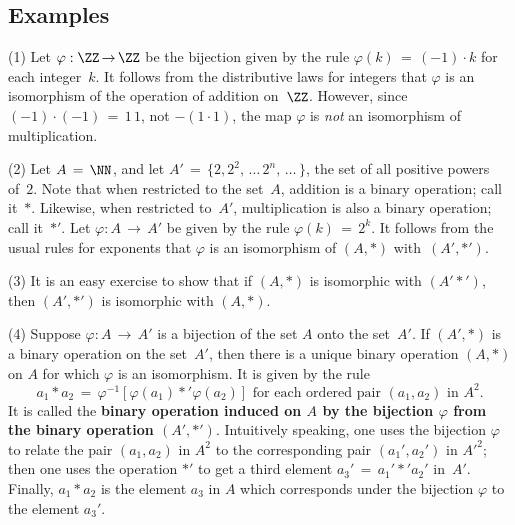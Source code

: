 {\VV

            \subsection{\small{\bf Examples}}
            \label{ExampA60.80}

\V

        (1) Let ${\varphi}:{\ZZ} \,{\rightarrow}\, {\ZZ}$ be the bijection given by the rule ${\varphi}(k) \,=\, (-1){\cdot}k$ for each integer~$k$.
    It follows from the distributive laws for integers that ${\varphi}$ is an isomorphism of the operation of addition on~${\ZZ}$.
    However, since $(-1){\cdot}(-1) \,=\, 1\,1$, not $-(1{\cdot}1)$, the map ${\varphi}$ is {\em not} an isomorphism of multiplication.

\V

        (2) Let $A \,=\, {\NN}$, and let $A' \,=\, \{2, 2^{2}, \,{\ldots}\, 2^{n},\,{\ldots}\,\}$, the set of all positive powers of~$2$.
    Note that when restricted to the set~$A$, addition is a binary operation; call it~${\ast}$.
    Likewise, when restricted to~$A'$, multiplication is also a binary operation; call it~${\ast}'$.
    Let ${\varphi}:A \,{\rightarrow}\, A'$ be given by the rule ${\varphi}(k) \,=\, 2^{k}$.
    It follows from the usual rules for exponents that ${\varphi}$ is an isomorphism of $(A,{\ast})$ with~$(A',{\ast}')$.

\V

        (3) It is an easy exercise to show that if $(A,{\ast})$ is isomorphic with $(A'{\ast}')$,
    then $(A',{\ast}')$ is isomorphic with $(A,{\ast})$.


\V

        (4) Suppose ${\varphi}:A \,{\rightarrow}\, A'$ is a bijection of the set $A$ onto the set~$A'$. If $(A',{\ast})$ is a binary operation on the set~$A'$, 
    then there is a unique binary operation $(A,{\ast})$ on $A$ for which ${\varphi}$ is an isomorphism. It is given by the rule
        \begin{displaymath}
        a_{1}{\ast}a_{2} \,=\, {\varphi}^{-1}[{\varphi}(a_{1}){\ast}'{\varphi}(a_{2})] \mbox{ for each ordered pair $(a_{1},a_{2})$ in $A^{2}$}.
        \end{displaymath}
    It is called the {\bf binary operation induced on $A$ by the bijection ${\varphi}$ from the binary operation $(A',{\ast}')$}.
    Intuitively speaking, one uses the bijection ${\varphi}$ to relate the pair $(a_{1},a_{2})$ in $A^{2}$
    to the corresponding pair $(a_{1}',a_{2}')$ in $A'^{2}$;
    then one uses the operation ${\ast}'$ to get a third element $a_{3}' \,=\, a_{1}'{\ast}'a_{2}'$ in~$A'$.
    Finally, $a_{1}{\ast}a_{2}$ is the element $a_{3}$ in $A$ which corresponds under the bijection ${\varphi}$ to the element $a_{3}'$.

}%

